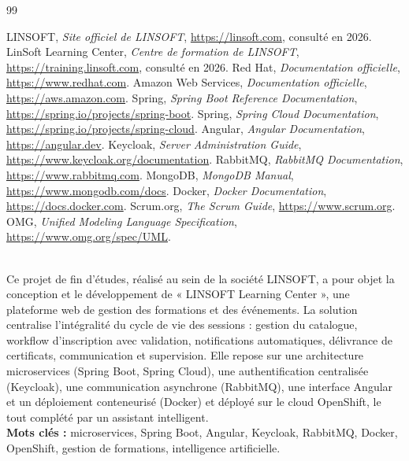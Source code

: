 \documentclass[12pt,a4paper,oneside]{report}
\begin{document}
\begin{thebibliography}{99}

 LINSOFT, \textit{Site officiel de LINSOFT}, \url{https://linsoft.com},
consulté en 2026.
 LinSoft Learning Center, \textit{Centre de formation de LINSOFT},
\url{https://training.linsoft.com}, consulté en 2026.
 Red Hat, \textit{Documentation officielle}, \url{https://www.redhat.com}.
 Amazon Web Services, \textit{Documentation officielle},
\url{https://aws.amazon.com}.
 Spring, \textit{Spring Boot Reference Documentation},
\url{https://spring.io/projects/spring-boot}.
 Spring, \textit{Spring Cloud Documentation},
\url{https://spring.io/projects/spring-cloud}.
 Angular, \textit{Angular Documentation}, \url{https://angular.dev}.
 Keycloak, \textit{Server Administration Guide},
\url{https://www.keycloak.org/documentation}.
 RabbitMQ, \textit{RabbitMQ Documentation}, \url{https://www.rabbitmq.com}.
 MongoDB, \textit{MongoDB Manual}, \url{https://www.mongodb.com/docs}.
 Docker, \textit{Docker Documentation}, \url{https://docs.docker.com}.
 Scrum.org, \textit{The Scrum Guide}, \url{https://www.scrum.org}.
 OMG, \textit{Unified Modeling Language Specification},
\url{https://www.omg.org/spec/UML}.
\end{thebibliography}
\clearpage

\thispagestyle{empty}
\\[0.3cm]
\noindent Ce projet de fin d'études, réalisé au sein de la société LINSOFT, a pour objet la
conception et le développement de « LINSOFT Learning Center », une plateforme web de gestion
des formations et des événements. La solution centralise l'intégralité du cycle de vie des
sessions : gestion du catalogue, workflow d'inscription avec validation, notifications
automatiques, délivrance de certificats, communication et supervision. Elle repose sur une
architecture microservices (Spring Boot, Spring Cloud), une authentification centralisée
(Keycloak), une communication asynchrone (RabbitMQ), une interface Angular et un déploiement
conteneurisé (Docker) et déployé sur le cloud OpenShift, le tout complété par un assistant
intelligent.\\[0.3cm]
\noindent\textbf{Mots clés :} microservices, Spring Boot, Angular, Keycloak, RabbitMQ, Docker, OpenShift,
gestion de formations, intelligence artificielle.
\end{document}
